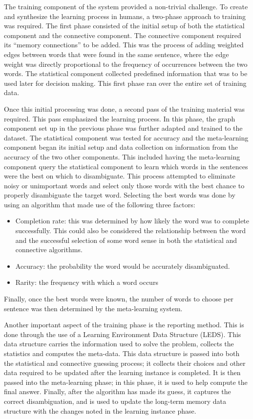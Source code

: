 The training component of the system provided a non-trivial challenge.  To
create and synthesize the learning process in humans, a two-phase approach to
training was required.  The first phase consisted of the initial setup of both
the statistical component and the connective component. The connective component
required its ``memory connections'' to be added.  This was the process of adding
weighted edges between words that were found in the same sentence, where the
edge weight was directly proportional to the frequency of occurrences between
the two words.  The statistical component collected predefined information that
was to be used later for decision making.  This first phase ran over the entire
set of training data.

Once this initial processing was done, a second pass of the training material
was required.  This pass emphasized the learning process.  In this phase, the
graph component set up in the previous phase was further adapted and trained to
the dataset.  The statistical component was tested for accuracy and the meta-learning component began its initial setup and data collection on information
from the accuracy of the two other components. This included having the meta-learning component query the statistical component to learn which words in the
sentences were the best on which to disambiguate. This process attempted to eliminate
noisy or unimportant words and select only those words with the best chance to
properly disambiguate the target word.  Selecting the best words was done by
using an algorithm that made use of the following three factors:

\begin{itemize}
	\item Completion rate: this was determined by how likely the
word was to complete successfully. This could also be considered the
relationship between the word and the successful selection of some word sense in
both the statistical and connective algorithms.      
	\item Accuracy: the probability the word would be accurately disambiguated.     
	\item Rarity: the frequency with which a word occurs
\end{itemize}

Finally, once the best words were known, the number of words to choose per
sentence was then determined by the meta-learning system.

Another important aspect of the training phase is the reporting method.  This is
done through the use of a Learning Environment Data Structure (LEDS).  This data
structure carries the information used to solve the problem, collects the
statistics and computes the meta-data. This data structure is passed into both
the statistical and connective guessing process; it collects their choices and
other data required to be updated after the learning instance is completed.  It
is then passed into the meta-learning phase; in this phase, it is used to help
compute the final answer. Finally, after the algorithm has made its guess, it
captures the correct disambiguation, and is used to update the long-term memory
data structure with the changes noted in the learning instance phase.

